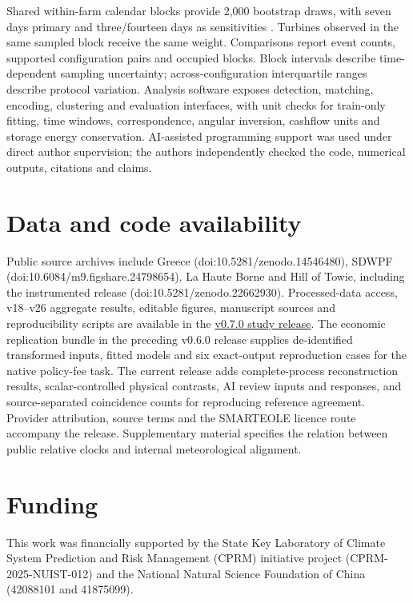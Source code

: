 \documentclass[preprint,12pt]{elsarticle}
\begin{document}
Shared within-farm calendar blocks provide 2,000 bootstrap draws, with seven days primary and three/fourteen days as sensitivities \citep{kunsch1989}. Turbines observed in the same sampled block receive the same weight. Comparisons report event counts, supported configuration pairs and occupied blocks. Block intervals describe time-dependent sampling uncertainty; across-configuration interquartile ranges describe protocol variation. Analysis software exposes detection, matching, encoding, clustering and evaluation interfaces, with unit checks for train-only fitting, time windows, correspondence, angular inversion, cashflow units and storage energy conservation. AI-assisted programming support was used under direct author supervision; the authors independently checked the code, numerical outputs, citations and claims.

\FloatBarrier
\section{Data and code availability}\label{data-and-code-availability}

Public source archives include Greece (doi:10.5281/zenodo.14546480), SDWPF (doi:10.6084/m9.figshare.24798654), La Haute Borne and Hill of Towie, including the instrumented release (doi:10.5281/zenodo.22662930). Processed-data access, v18--v26 aggregate results, editable figures, manuscript sources and reproducibility scripts are available in the \href{https://github.com/longjingpy/wind-power-event-protocol-audit/releases/tag/v0.7.0}{v0.7.0 study release}. The economic replication bundle in the preceding v0.6.0 release supplies de-identified transformed inputs, fitted models and six exact-output reproduction cases for the native policy-fee task. The current release adds complete-process reconstruction results, scalar-controlled physical contrasts, AI review inputs and responses, and source-separated coincidence counts for reproducing reference agreement. Provider attribution, source terms and the SMARTEOLE licence route accompany the release. Supplementary material specifies the relation between public relative clocks and internal meteorological alignment.

\FloatBarrier

\section*{Funding}
This work was financially supported by the State Key Laboratory of Climate System Prediction and Risk Management (CPRM) initiative project (CPRM-2025-NUIST-012) and the National Natural Science Foundation of China (42088101 and 41875099).
\end{document}
